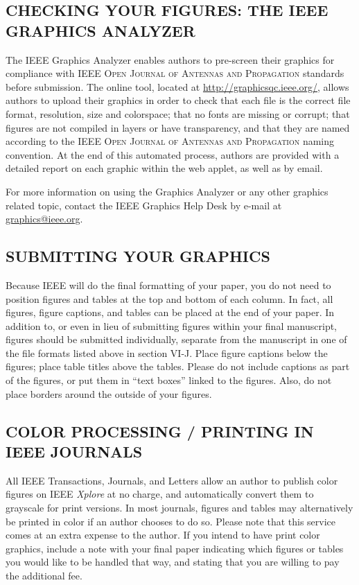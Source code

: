 \documentclass{IEEEoj}
\begin{document}
\subsection{CHECKING YOUR FIGURES: THE IEEE GRAPHICS ANALYZER}
The IEEE Graphics Analyzer enables authors to pre-screen their graphics for 
compliance with \textsc{IEEE Open Journal of Antennas and Propagation} standards before submission. The online 
tool, located at \underline {http://graphicsqc.ieee.org/}, allows authors to 
upload their graphics in order to check that each file is the correct file 
format, resolution, size and colorspace; that no fonts are missing or 
corrupt; that figures are not compiled in layers or have transparency, and 
that they are named according to the \textsc{IEEE Open Journal of Antennas and Propagation} naming convention. 
At the end of this automated process, authors are provided with a detailed 
report on each graphic within the web applet, as well as by email.

For more information on using the Graphics Analyzer 
or any other graphics related topic, contact the IEEE Graphics Help Desk by 
e-mail at \underline {graphics@ieee.org}.

\subsection{SUBMITTING YOUR GRAPHICS}
Because IEEE will do the final formatting of your paper, 
you do not need to position figures and tables at the top and bottom of each 
column. In fact, all figures, figure captions, and tables can be placed at 
the end of your paper. In addition to, or even in lieu of submitting figures 
within your final manuscript, figures should be submitted individually, 
separate from the manuscript in one of the file formats listed above in 
section VI-J. Place figure captions below the figures; place table titles 
above the tables. Please do not include captions as part of the figures, or 
put them in ``text boxes'' linked to the figures. Also, do not place borders 
around the outside of your figures.

\subsection{COLOR PROCESSING / PRINTING IN IEEE JOURNALS}
All IEEE Transactions, Journals, and Letters allow an author to publish 
color figures on IEEE \textit{Xplore}{\textregistered} at no charge, and automatically 
convert them to grayscale for print versions. In most journals, figures and 
tables may alternatively be printed in color if an author chooses to do so. 
Please note that this service comes at an extra expense to the author. If 
you intend to have print color graphics, include a note with your final 
paper indicating which figures or tables you would like to be handled that 
way, and stating that you are willing to pay the additional fee.
\end{document}

